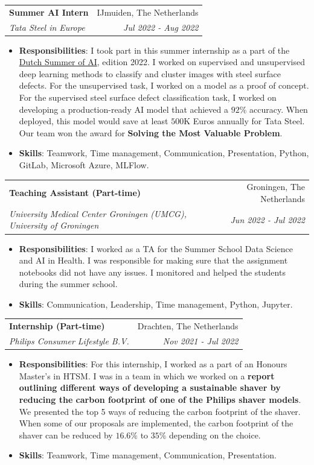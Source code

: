 \documentclass[letterpaper, 10pt]{article}
\makeatletter
\newcommand{\resumeItem}[2]{
    \item\small{
        \textbf{#1}{: #2 \vspace{-2pt}}
    }
}
\newcommand{\resumeSubheading}[4]{
    \vspace{-1pt}\item
    \begin{tabular*}{0.97\textwidth}{l@{\extracolsep{\fill}}r}
        \textbf{#1} & #2 \\
        \textit{\small#3} & \textit{\small #4} \\
    \end{tabular*}\vspace{-5pt}
}
\newcommand{\resumeSubHeadingListStart}{\begin{itemize}[leftmargin=*]}
\newcommand{\resumeSubHeadingListEnd}{\end{itemize}\vspace{-5pt}}
\makeatother
\begin{document}
        \resumeSubheading{Summer AI Intern}{IJmuiden, The Netherlands}{Tata Steel in Europe}{Jul 2022 - Aug 2022}
            \resumeSubHeadingListStart
                \resumeItem{Responsibilities}{I took part in this summer internship as a part of the \href{https://www.summerof.ai/}{Dutch Summer of AI}, edition 2022. I worked on supervised and unsupervised deep learning methods to classify and cluster images with steel surface defects. For the unsupervised task, I worked on a model as a proof of concept. For the supervised steel surface defect classification task, I worked on developing a production-ready AI model that achieved a $92\%$ accuracy. When deployed, this model would save at least $500$K Euros annually for Tata Steel. Our team won the award for \textbf{Solving the Most Valuable Problem}.}
                \resumeItem{Skills}{Teamwork, Time management, Communication, Presentation, Python, GitLab, Microsoft Azure, MLFlow.}
            \resumeSubHeadingListEnd

        \resumeSubheading{Teaching Assistant (Part-time)}{Groningen, The Netherlands}{University Medical Center Groningen (UMCG), University of Groningen}{Jun 2022 - Jul 2022}
            \resumeSubHeadingListStart
                \resumeItem{Responsibilities}{I worked as a TA for the Summer School Data Science and AI in Health. I was responsible for making sure that the assignment notebooks did not have any issues. I monitored and helped the students during the summer school.}
                \resumeItem{Skills}{Communication, Leadership, Time management, Python, Jupyter.}
            \resumeSubHeadingListEnd

        \resumeSubheading{Internship (Part-time)}{Drachten, The Netherlands}{Philips Consumer Lifestyle B.V.}{Nov 2021 - Jul 2022}
            \resumeSubHeadingListStart
                \resumeItem{Responsibilities}{For this internship, I worked as a part of an Honours Master's in HTSM. I was in a team in which we worked on a \textbf{report outlining different ways of developing a sustainable shaver by reducing the carbon footprint of one of the Philips shaver models}. We presented the top 5 ways of reducing the carbon footprint of the shaver. When some of our proposals are implemented, the carbon footprint of the shaver can be reduced by $16.6\%$ to $35\%$ depending on the choice.}
                \resumeItem{Skills}{Teamwork, Time management, Communication, Presentation.}
            \resumeSubHeadingListEnd
\end{document}
